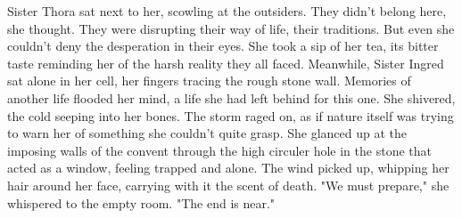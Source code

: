 \documentclass[11pt]{article}
\begin{document}
Sister Thora sat next to her, scowling at the outsiders. They didn't belong here, she thought. They were disrupting their way of life, their traditions. But even she couldn't deny the desperation in their eyes. She took a sip of her tea, its bitter taste reminding her of the harsh reality they all faced.
Meanwhile, Sister Ingred sat alone in her cell, her fingers tracing the rough stone wall. Memories of another life flooded her mind, a life she had left behind for this one. She shivered, the cold seeping into her bones. The storm raged on, as if nature itself was trying to warn her of something she couldn't quite grasp.
She glanced up at the imposing walls of the convent through the high circuler hole in the stone that acted as a window, feeling trapped and alone. The wind picked up, whipping her hair around her face, carrying with it the scent of death.
"We must prepare," she whispered to the empty room. "The end is near."
\end{document}
